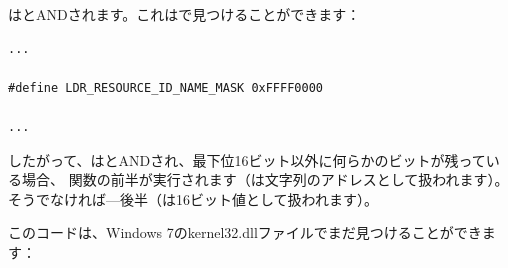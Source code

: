 はとANDされます。これはで見つけることができます：

\begin{lstlisting}[style=customc]
...

#define LDR_RESOURCE_ID_NAME_MASK 0xFFFF0000

...
\end{lstlisting}

したがって、はとANDされ、最下位16ビット以外に何らかのビットが残っている場合、
関数の前半が実行されます（は文字列のアドレスとして扱われます）。
そうでなければ---後半（は16ビット値として扱われます）。

このコードは、Windows 7のkernel32.dllファイルでまだ見つけることができます：

